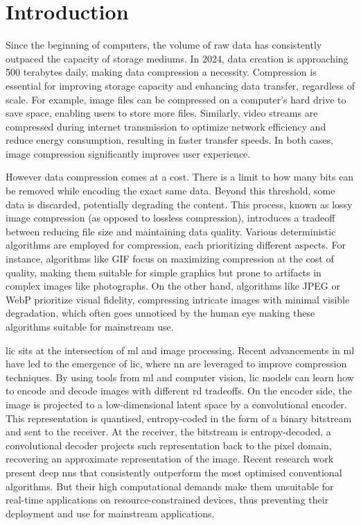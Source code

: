 \chapter*{Introduction}
Since the beginning of computers, the volume of raw data has consistently outpaced the capacity of storage mediums. In 2024, data creation is approaching 500 terabytes daily, making data compression a necessity. Compression is essential for improving storage capacity and enhancing data transfer, regardless of scale. For example, image files can be compressed on a computer's hard drive to save space, enabling users to store more files. Similarly, video streams are compressed during internet transmission to optimize network efficiency and reduce energy consumption, resulting in faster transfer speeds. In both cases, image compression significantly improves user experience.

However data compression comes at a cost. There is a limit to how many bits can be removed while encoding the exact same data. Beyond this threshold, some data is discarded, potentially degrading the content. This process, known as lossy image compression (as opposed to lossless compression), introduces a tradeoff between reducing file size and maintaining data quality. Various deterministic algorithms are employed for compression, each prioritizing different aspects. For instance, algorithms like GIF focus on maximizing compression at the cost of quality, making them suitable for simple graphics but prone to artifacts in complex images like photographs. On the other hand, algorithms like JPEG or WebP prioritize visual fidelity, compressing intricate images with minimal visible degradation, which often goes unnoticed by the human eye making these algorithms suitable for mainstream use.

\acrfull{lic} sits at the intersection of \acrfull{ml} and image processing. Recent advancements in \acrshort{ml} have led to the emergence of \acrshort{lic}, where \acrfull{nn} are leveraged to improve compression techniques. By using tools from \acrshort{ml} and computer vision, \acrshort{lic} models can learn how to encode and decode images with different \acrfull{rd} tradeoffs. On the encoder side, the image is projected to a low-dimensional latent space by a convolutional encoder. This representation is quantised, entropy-coded in the form of a binary bitstream and sent to the receiver. At the receiver, the bitstream is entropy-decoded, a convolutional decoder projects such representation back to the pixel domain, recovering an approximate representation of the image. Recent research work present deep \acrshort{nn}s that consistently outperform the most optimised conventional algorithms. But their high computational demands make them unsuitable for real-time applications on resource-constrained devices, thus preventing their deployment and use for mainstream applications.


